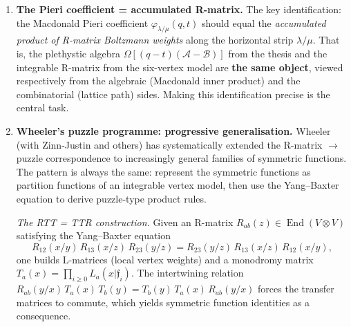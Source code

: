 \documentclass[11pt]{article}
\theoremstyle{plain}
\theoremstyle{definition}
\theoremstyle{remark}
\begin{document}
\begin{enumerate}
\item \textbf{The Pieri coefficient = accumulated R-matrix.}
  The key identification: the Macdonald Pieri coefficient
  $\varphi_{\lambda/\mu}(q,t)$ should equal the
  \emph{accumulated product of R-matrix Boltzmann weights}
  along the horizontal strip $\lambda/\mu$.
  That is, the plethystic algebra
  $\Omega[(q-t)(\mathcal{A}-\mathcal{B})]$ from the thesis
  and the integrable R-matrix from the six-vertex model
  are \textbf{the same object}, viewed respectively from
  the algebraic (Macdonald inner product) and the
  combinatorial (lattice path) sides.
  Making this identification precise is the central task.

\item \textbf{Wheeler's puzzle programme: progressive generalisation.}
  Wheeler (with Zinn-Justin and others) has systematically
  extended the R-matrix $\to$ puzzle correspondence to
  increasingly general families of symmetric functions.
  The pattern is always the same: represent the symmetric
  functions as partition functions of an integrable vertex
  model, then use the Yang--Baxter equation to derive
  puzzle-type product rules.

  \smallskip\noindent\emph{The RTT = TTR construction.}
  Given an R-matrix $R_{ab}(z) \in \operatorname{End}(V \otimes V)$
  satisfying the Yang--Baxter equation
  \[
    R_{12}(x/y)\, R_{13}(x/z)\, R_{23}(y/z)
    = R_{23}(y/z)\, R_{13}(x/z)\, R_{12}(x/y),
  \]
  one builds L-matrices (local vertex weights) and a
  monodromy matrix
  $T_a(x) = \prod_{i \geqslant 0} L_a(x | \mathfrak{f}_i)$.
  The intertwining relation
  $R_{ab}(y/x)\, T_a(x)\, T_b(y) = T_b(y)\, T_a(x)\, R_{ab}(y/x)$
  forces the transfer matrices to commute, which yields
  symmetric function identities as a consequence.


\end{enumerate}
\end{document}
